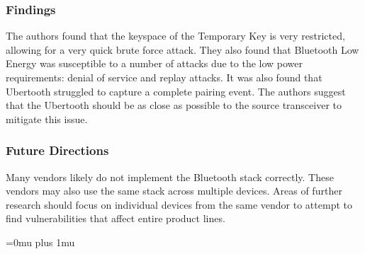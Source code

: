 \subsubsection{Findings}

\noindent
The authors found that the keyspace of the Temporary Key is very restricted, allowing for a very quick brute force attack. They also found that Bluetooth Low Energy was susceptible to a number of attacks due to the low power requirements: denial of service and replay attacks. It was also found that Ubertooth struggled to capture a complete pairing event. The authors suggest that the Ubertooth should be as close as possible to the source transceiver to mitigate this issue. 

\subsubsection{Future Directions}

\noindent
Many vendors likely do not implement the Bluetooth stack correctly. These vendors may also use the same stack across multiple devices. Areas of further research should focus on individual devices from the same vendor to attempt to find vulnerabilities that affect entire product lines. 

\Urlmuskip=0mu plus 1mu\relax

\pagebreak
